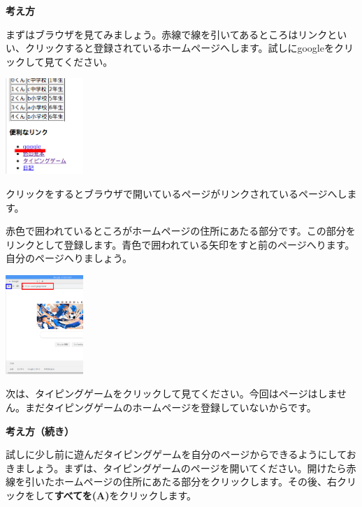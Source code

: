 \documentclass[a4paper,12pt]{jarticle}
\begin{document}
\textbf{考え方}



まずはブラウザを見てみましょう。赤線で線を引いてあるところはリンクといい、クリックすると登録されているホームページへします。試しにgoogleをクリックして見てください。


\bigskip

\centering
\includegraphics[width=0.22\textwidth]{textbook-img194.png}


\flushleft

\bigskip

クリックをするとブラウザで開いているページがリンクされているページへします。

赤色で囲われているところがホームページの住所にあたる部分です。この部分をリンクとして登録します。青色で囲われている矢印をすと前のページへります。自分のページへりましょう。



\bigskip

\centering
\includegraphics[width=0.22\textwidth]{textbook-img195.png}

\bigskip

\flushleft
次は、タイピングゲームをクリックして見てください。今回はページはしません。まだタイピングゲームのホームページを登録していないからです。


\clearpage
\textbf{考え方（続き）}



試しに少し前に遊んだタイピングゲームを自分のページからできるようにしておきましょう。まずは、タイピングゲームのページを開いてください。開けたら赤線を引いたホームページの住所にあたる部分をクリックします。その後、右クリックをして\textbf{すべてを(A)}をクリックします。
\end{document}
